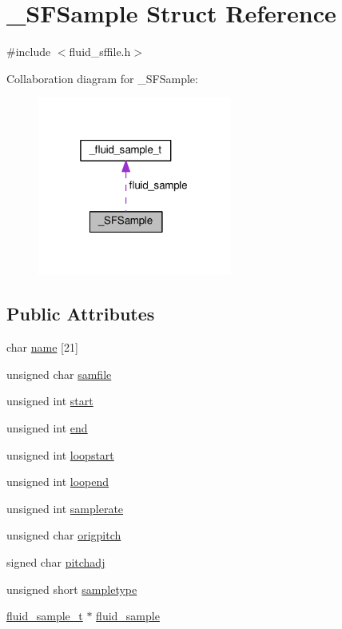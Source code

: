 \hypertarget{struct__SFSample}{}\section{\+\_\+\+S\+F\+Sample Struct Reference}
\label{struct__SFSample}


{\ttfamily \#include $<$fluid\+\_\+sffile.\+h$>$}



Collaboration diagram for \+\_\+\+S\+F\+Sample\+:
\nopagebreak
\begin{figure}[H]
\begin{center}
\leavevmode
\includegraphics[width=181pt]{struct__SFSample__coll__graph}
\end{center}
\end{figure}
\subsection*{Public Attributes}
\begin{DoxyCompactItemize}
\item 
char \hyperlink{struct__SFSample_a0589c25094f41ecef751f0a7482f058c}{name} \mbox{[}21\mbox{]}
\item 
unsigned char \hyperlink{struct__SFSample_a859a2c272748d7b224b5f42212a1a84f}{samfile}
\item 
unsigned int \hyperlink{struct__SFSample_a2a482331e1ce21c9cdf682eaf2f11cd8}{start}
\item 
unsigned int \hyperlink{struct__SFSample_a0188476dfeccad0183d4a51ff804ff48}{end}
\item 
unsigned int \hyperlink{struct__SFSample_aa8f91bb5d31558250f1bed90d7adbd27}{loopstart}
\item 
unsigned int \hyperlink{struct__SFSample_ab71752155ec1bec1f0e0e1549e74ab4a}{loopend}
\item 
unsigned int \hyperlink{struct__SFSample_ad4d7aef0c572fbd237ae2fa609fc1694}{samplerate}
\item 
unsigned char \hyperlink{struct__SFSample_a335de32fb79168fc770af84a7cabf241}{origpitch}
\item 
signed char \hyperlink{struct__SFSample_a042eac6bb46b9198a1782627cfa8558a}{pitchadj}
\item 
unsigned short \hyperlink{struct__SFSample_a2bcb91041d5481766c21abfd4b0fe17d}{sampletype}
\item 
\hyperlink{types_8h_abf9174d452679ca1a4ee7d693fb773cf}{fluid\+\_\+sample\+\_\+t} $\ast$ \hyperlink{struct__SFSample_a94a75783ed7ee545a044bc2b0a30a131}{fluid\+\_\+sample}
\end{DoxyCompactItemize}


